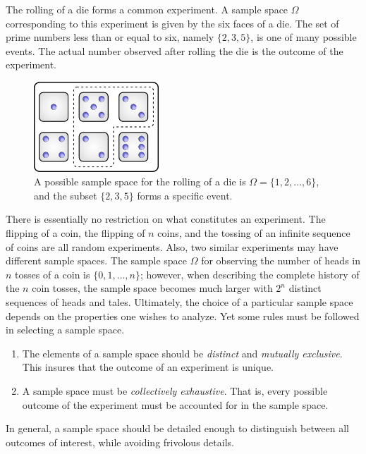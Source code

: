 \begin{example}
The rolling of a die forms a common experiment.
A sample space $\Omega$ corresponding to this experiment is given by the six faces of a die.
The set of prime numbers less than or equal to six, namely $\{ 2, 3, 5 \}$, is one of many possible events.
The actual number observed after rolling the die is the outcome of the experiment.

\begin{figure}[htb!]
\begin{center}
\includegraphics[height=3.38cm]{Figures/2Chapter/dices}
\caption{A possible sample space for the rolling of a die is $\Omega = \{ 1, 2, \ldots, 6 \}$, and the subset $\{2, 3, 5 \}$ forms a specific event.}
\end{center}
\end{figure}
\end{example}

There is essentially no restriction on what constitutes an experiment.
The flipping of a coin, the flipping of $n$ coins, and the tossing of an infinite sequence of coins are all random experiments.
Also, two similar experiments may have different sample spaces.
The sample space $\Omega$ for observing the number of heads in $n$ tosses of a coin is $\{ 0, 1, \ldots, n \}$; however, when describing the complete history of the $n$ coin tosses, the sample space becomes much larger with $2^n$ distinct sequences of heads and tales.
Ultimately, the choice of a particular sample space depends on the properties one wishes to analyze.
Yet some rules must be followed in selecting a sample space.
\begin{enumerate}
\item The elements of a sample space should be \emph{distinct} and \emph{mutually exclusive}.
This insures that the outcome of an experiment is unique.
\item A sample space must be \emph{collectively exhaustive}.
That is, every possible outcome of the experiment must be accounted for in the sample space.
\end{enumerate}
In general, a sample space should be detailed enough to distinguish between all outcomes of interest, while avoiding frivolous details.

